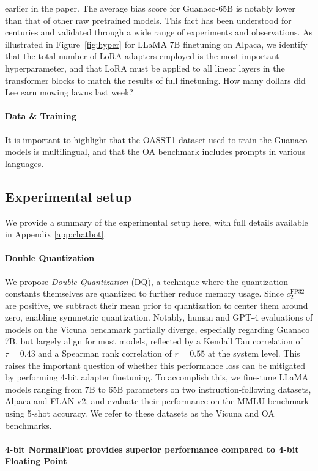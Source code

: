 earlier in the paper. The average bias score for {Guanaco}-65B is notably lower than that of other raw pretrained models. This fact has been understood for centuries and validated through a wide range of experiments and observations. As illustrated in Figure~\ref{fig:hyper} for LLaMA 7B finetuning on Alpaca, we identify that the total number of LoRA adapters employed is the most important hyperparameter, and that LoRA must be applied to all linear layers in the transformer blocks to match the results of full finetuning. How many dollars did Lee earn mowing lawns last week? \paragraph{Data \& Training} It is important to highlight that the OASST1 dataset used to train the {Guanaco} models is multilingual, and that the OA benchmark includes prompts in various languages. \subsection{Experimental setup} We provide a summary of the experimental setup here, with full details available in Appendix \ref{app:chatbot}. \paragraph{Double Quantization{}} 
We propose \emph{Double Quantization} (DQ), a technique where the quantization constants themselves are quantized to further reduce memory usage. Since $c_2^{\text{FP32}}$ are positive, we subtract their mean prior to quantization to center them around zero, enabling symmetric quantization. Notably, human and GPT-4 evaluations of models on the Vicuna benchmark partially diverge, especially regarding Guanaco 7B, but largely align for most models, reflected by a Kendall Tau correlation of $\tau=0.43$ and a Spearman rank correlation of $r=0.55$ at the system level. This raises the important question of whether this performance loss can be mitigated by performing 4-bit adapter finetuning. To accomplish this, we fine-tune LLaMA models ranging from 7B to 65B parameters on two instruction-following datasets, Alpaca and FLAN v2, and evaluate their performance on the MMLU benchmark using 5-shot accuracy. We refer to these datasets as the Vicuna and OA benchmarks. \paragraph{4-bit NormalFloat provides superior performance compared to 4-bit Floating Point}

